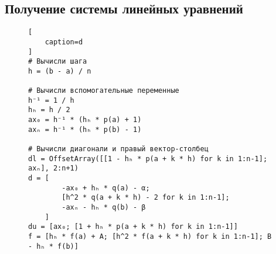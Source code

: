 \documentclass{article}
\numberwithin{equation}{section}
\begin{document}
\subsection{Получение системы линейных уравнений}


\begin{figure}[H]
\begin{lstlisting}[
    caption=d
]
# Вычисли шага
h = (b - a) / n

# Вычисли вспомогательные переменные
h⁻¹ = 1 / h
hₕ = h / 2
ax₀ = h⁻¹ * (hₕ * p(a) + 1)
axₙ = h⁻¹ * (hₕ * p(b) - 1)

# Вычисли диагонали и правый вектор-столбец
dl = OffsetArray([[1 - hₕ * p(a + k * h) for k in 1:n-1]; axₙ], 2:n+1)
d = [
        -ax₀ + hₕ * q(a) - α;
        [h^2 * q(a + k * h) - 2 for k in 1:n-1];
        -axₙ - hₕ * q(b) - β
    ]
du = [ax₀; [1 + hₕ * p(a + k * h) for k in 1:n-1]]
f = [hₕ * f(a) + A; [h^2 * f(a + k * h) for k in 1:n-1]; B - hₕ * f(b)]
\end{lstlisting}
\end{figure}
\end{document}
